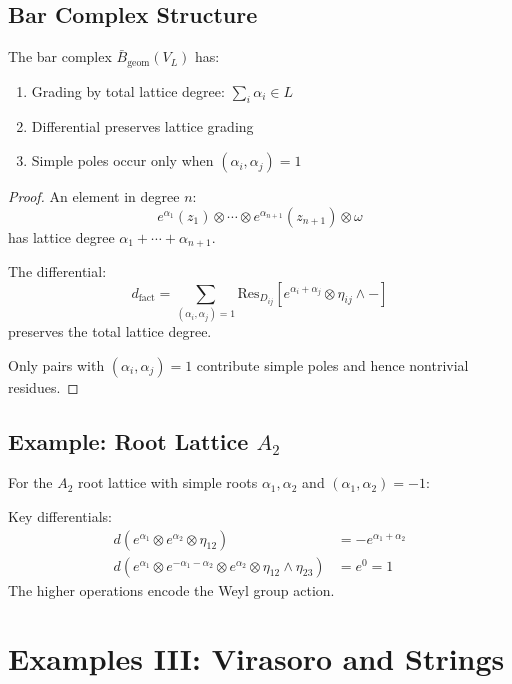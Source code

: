 \subsection{Bar Complex Structure}
 
\begin{theorem}
The bar complex $\bar{B}_{\text{geom}}(V_L)$ has:
\begin{enumerate}
\item Grading by total lattice degree: $\sum_i \alpha_i \in L$
\item Differential preserves lattice grading
\item Simple poles occur only when $(\alpha_i, \alpha_j) = 1$
\end{enumerate}
\end{theorem}
 
\begin{proof}
An element in degree $n$:
\[
e^{\alpha_1}(z_1) \otimes \cdots \otimes e^{\alpha_{n+1}}(z_{n+1}) \otimes \omega
\]
has lattice degree $\alpha_1 + \cdots + \alpha_{n+1}$.
 
The differential:
\[
d_{\text{fact}} = \sum_{(\alpha_i,\alpha_j)=1} \text{Res}_{D_{ij}}\left[e^{\alpha_i+\alpha_j} \otimes \eta_{ij} \wedge -\right]
\]
preserves the total lattice degree.
 
Only pairs with $(\alpha_i, \alpha_j) = 1$ contribute simple poles and hence nontrivial residues.
\end{proof}
 
\subsection{Example: Root Lattice $A_2$}
 
For the $A_2$ root lattice with simple roots $\alpha_1, \alpha_2$ and $(\alpha_1, \alpha_2) = -1$:
 
\begin{proposition}
Key differentials:
\begin{align}
d(e^{\alpha_1} \otimes e^{\alpha_2} \otimes \eta_{12}) &= -e^{\alpha_1+\alpha_2} \\
d(e^{\alpha_1} \otimes e^{-\alpha_1-\alpha_2} \otimes e^{\alpha_2} \otimes \eta_{12} \wedge \eta_{23}) &= e^0 = 1
\end{align}
The higher operations encode the Weyl group action.
\end{proposition}
 
\section{Examples III: Virasoro and Strings}
 
